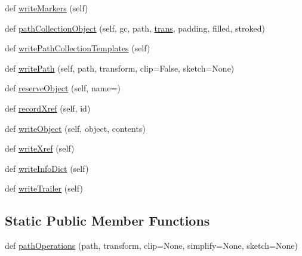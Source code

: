 \begin{DoxyCompactItemize}
\item 
def \hyperlink{classmatplotlib_1_1backends_1_1backend__pdf_1_1PdfFile_aea91127155bf79a93fdf312156bd9e45}{write\+Markers} (self)
\item 
def \hyperlink{classmatplotlib_1_1backends_1_1backend__pdf_1_1PdfFile_a28ea852fb67ba81c162cbc91c152cef7}{path\+Collection\+Object} (self, gc, path, \hyperlink{size_2foo_8f90_afabfd8da71309850231a00e53c61f106}{trans}, padding, filled, stroked)
\item 
def \hyperlink{classmatplotlib_1_1backends_1_1backend__pdf_1_1PdfFile_a9178051224898887c4a1e114a26eae9d}{write\+Path\+Collection\+Templates} (self)
\item 
def \hyperlink{classmatplotlib_1_1backends_1_1backend__pdf_1_1PdfFile_a6e72700f9c31e1ee51c4d860848e1413}{write\+Path} (self, path, transform, clip=False, sketch=None)
\item 
def \hyperlink{classmatplotlib_1_1backends_1_1backend__pdf_1_1PdfFile_a0d9a178b8a0133b0734814782ed5af24}{reserve\+Object} (self, name=\textquotesingle{}\textquotesingle{})
\item 
def \hyperlink{classmatplotlib_1_1backends_1_1backend__pdf_1_1PdfFile_aa5e07b705b9f07f514b24aeb7480bac9}{record\+Xref} (self, id)
\item 
def \hyperlink{classmatplotlib_1_1backends_1_1backend__pdf_1_1PdfFile_a862efb1bfa020e81dc0210e51a9559f6}{write\+Object} (self, object, contents)
\item 
def \hyperlink{classmatplotlib_1_1backends_1_1backend__pdf_1_1PdfFile_a4d4a8217e0f27a7986c157d037a9d4a0}{write\+Xref} (self)
\item 
def \hyperlink{classmatplotlib_1_1backends_1_1backend__pdf_1_1PdfFile_a122759f8f1c1b1922eeaba45e75cd353}{write\+Info\+Dict} (self)
\item 
def \hyperlink{classmatplotlib_1_1backends_1_1backend__pdf_1_1PdfFile_ab4c52bf362bc703efd69b0c27c280d5d}{write\+Trailer} (self)
\end{DoxyCompactItemize}
\subsection*{Static Public Member Functions}
\begin{DoxyCompactItemize}
\item 
def \hyperlink{classmatplotlib_1_1backends_1_1backend__pdf_1_1PdfFile_a55618b25471f81ad40afd17522114337}{path\+Operations} (path, transform, clip=None, simplify=None, sketch=None)
\end{DoxyCompactItemize}

